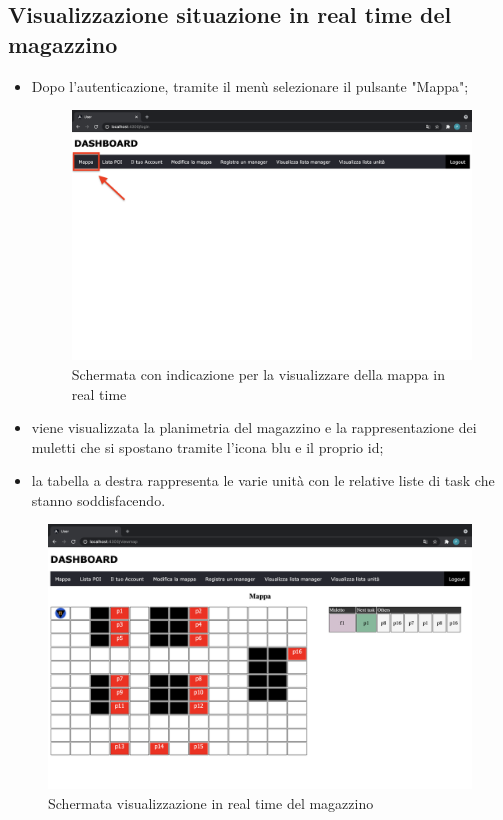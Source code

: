 \subsection{Visualizzazione situazione in real time del magazzino}
\begin{itemize}
    \item Dopo l'autenticazione, tramite il menù selezionare il pulsante "Mappa";
    \begin{figure}[H]
        \centering
        \includegraphics[scale=0.12]{res/images/dashboard1.png}
        \caption{Schermata con indicazione per la visualizzare della mappa in real time}
    \end{figure}
    \item viene visualizzata la planimetria del magazzino e la rappresentazione dei muletti che si spostano tramite l'icona blu e il proprio id;
    \item la tabella a destra rappresenta le varie unità con le relative liste di task che stanno soddisfacendo.
    
\end{itemize}

\begin{figure}[H]
    \centering
    \includegraphics[scale=0.12]{res/images/map_user.png}
    \caption{Schermata visualizzazione in real time del magazzino}
\end{figure}

